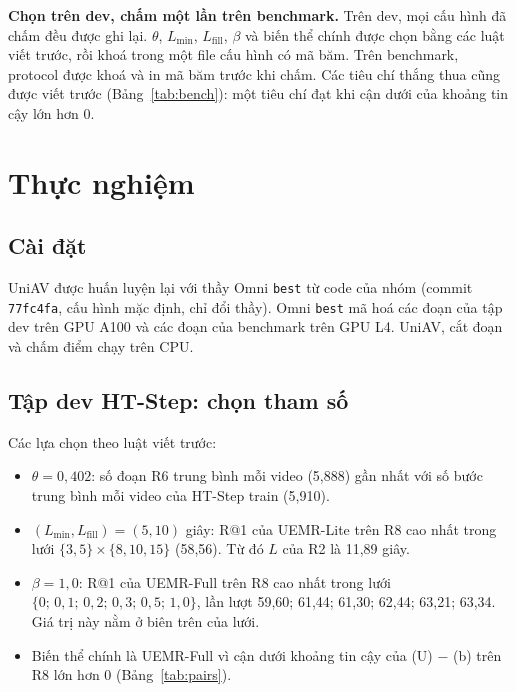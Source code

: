 \documentclass{IEEEtran}
\begin{document}
\textbf{Chọn trên dev, chấm một lần trên benchmark.} Trên dev, mọi cấu hình đã chấm đều được ghi lại. $\theta$, $L_{\min}$, $L_{\mathrm{fill}}$, $\beta$ và biến thể chính được chọn bằng các luật viết trước, rồi khoá trong một file cấu hình có mã băm. Trên benchmark, protocol được khoá và in mã băm trước khi chấm. Các tiêu chí thắng thua cũng được viết trước (Bảng~\ref{tab:bench}): một tiêu chí đạt khi cận dưới của khoảng tin cậy lớn hơn 0.

\section{Thực nghiệm}
\label{sec:exp}

\subsection{Cài đặt}
UniAV được huấn luyện lại với thầy Omni \texttt{best} từ code của nhóm (commit \texttt{77fc4fa}, cấu hình mặc định, chỉ đổi thầy). Omni \texttt{best} mã hoá các đoạn của tập dev trên GPU A100 và các đoạn của benchmark trên GPU L4. UniAV, cắt đoạn và chấm điểm chạy trên CPU.

\subsection{Tập dev HT-Step: chọn tham số}
Các lựa chọn theo luật viết trước:
\begin{itemize}
\item $\theta = 0{,}402$: số đoạn R6 trung bình mỗi video (5,888) gần nhất với số bước trung bình mỗi video của HT-Step train (5,910).
\item $(L_{\min}, L_{\mathrm{fill}}) = (5, 10)$ giây: R@1 của UEMR-Lite trên R8 cao nhất trong lưới $\{3, 5\} \times \{8, 10, 15\}$ (58,56). Từ đó $L$ của R2 là 11,89 giây.
\item $\beta = 1{,}0$: R@1 của UEMR-Full trên R8 cao nhất trong lưới $\{0;\,0{,}1;\,0{,}2;\,0{,}3;\,0{,}5;\,1{,}0\}$, lần lượt 59,60; 61,44; 61,30; 62,44; 63,21; 63,34. Giá trị này nằm ở biên trên của lưới.
\item Biến thể chính là UEMR-Full vì cận dưới khoảng tin cậy của (U) $-$ (b) trên R8 lớn hơn 0 (Bảng~\ref{tab:pairs}).
\end{itemize}
\end{document}
